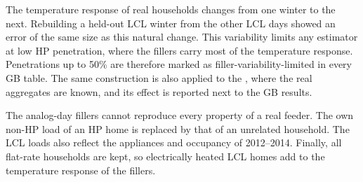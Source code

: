 The temperature response of real households changes from one winter to the next. Rebuilding a held-out LCL winter from the other LCL days showed an error of the same size as this natural change. This variability limits any estimator at low HP penetration, where the fillers carry most of the temperature response. Penetrations up to 50\% are therefore marked as filler-variability-limited in every GB table. The same construction is also applied to the \dataCH, where the real aggregates are known, and its effect is reported next to the GB results.

The analog-day fillers cannot reproduce every property of a real feeder. The own non-HP load of an HP home is replaced by that of an unrelated household. The LCL loads also reflect the appliances and occupancy of 2012--2014. Finally, all flat-rate households are kept, so electrically heated LCL homes add to the temperature response of the fillers.
